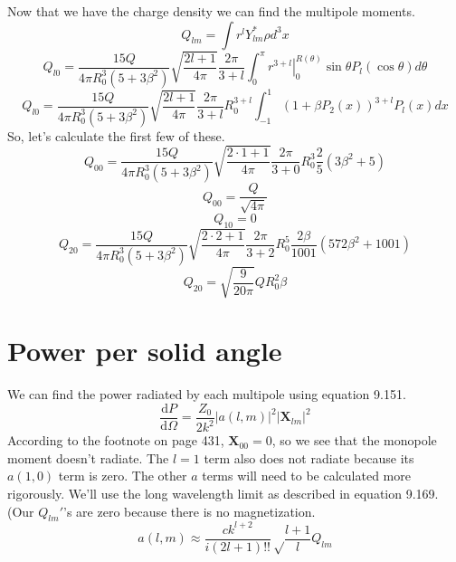 \documentclass[10pt,a4paper]{article}
\begin{document}
Now that we have the charge density we can find the multipole moments.
\begin{equation}
Q_{lm}=\int r^l Y_{lm}^* \rho d^3x
\end{equation}
\begin{equation}
Q_{l0}=\frac{15Q}{4\pi R_0^3(5+3\beta^2)}\sqrt{\frac{2l+1}{4\pi}}\frac{2\pi}{3+l}\int_0^\pi \left.r^{3+l}\right|_0^{R(\theta)}\sin\theta P_l(\cos\theta) d\theta
\end{equation}
\begin{equation}
Q_{l0}=\frac{15Q}{4\pi R_0^3(5+3\beta^2)}\sqrt{\frac{2l+1}{4\pi}}\frac{2\pi}{3+l}R_0^{3+l}\int_{-1}^1(1+\beta P_2(x))^{3+l}P_l(x) dx
\end{equation}
So, let's calculate the first few of these.
\begin{equation}
Q_{00}=\frac{15Q}{4\pi R_0^3(5+3\beta^2)}\sqrt{\frac{2 \cdot 1+1}{4\pi}}\frac{2\pi}{3+0}R_0^3\frac{2}{5}(3\beta^2+5)
\end{equation}
\begin{equation}
Q_{00}=\frac{Q}{\sqrt{4\pi}}
\end{equation}
\begin{equation}
Q_{10}=0
\end{equation}
\begin{equation}
Q_{20}=\frac{15Q}{4\pi R_0^3(5+3\beta^2)}\sqrt{\frac{2\cdot 2+1}{4\pi}}\frac{2\pi}{3+2}R_0^5\frac{2\beta}{1001}(572\beta^2+1001)
\end{equation}
\begin{equation}
Q_{20}=\sqrt{\frac{9}{20\pi}}QR_0^2\beta
\end{equation}

\section{Power per solid angle}
We can find the power radiated by each multipole using equation 9.151.
\begin{equation}
\frac{\mathrm{d}P}{\mathrm{d}\Omega}=\frac{Z_0}{2k^2}\left|a(l,m)\right|^2\left|\mathbf{X}_{lm}\right|^2
\end{equation}
According to the footnote on page 431, $\mathbf{X}_{00}=0$, so we see that the monopole moment doesn't radiate. The $l=1$ term also does not radiate because its $a(1,0)$ term is zero.  The other $a$ terms will need to be calculated more rigorously. We'll use the long wavelength limit as described in equation 9.169. (Our $Q_{lm}'$'s are zero because there is no magnetization.
\begin{equation}
a(l,m)\approx \frac{ck^{l+2}}{i(2l+1)!!}\sqrt\frac{l+1}{l}Q_{lm}
\end{equation}
\end{document}
